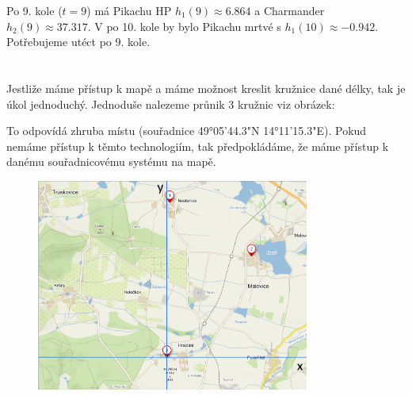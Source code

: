 \documentclass[12pt, a4paper]{article}
\begin{document}
Po 9. kole ($t=9$) má Pikachu HP $h_1(9) \approx 6.864$ a Charmander $h_2(9) \approx 37.317$. V po 10. kole by bylo Pikachu mrtvé s $h_1(10) \approx -0.942$. Potřebujeme utéct po 9. kole.

\section{}
Jestliže máme přístup k mapě a máme možnost kreslit kružnice dané délky, tak je úkol jednoduchý. Jednoduše nalezeme průnik 3 kružnic viz obrázek:
\begin{figure}[H]
  \centering
  \hfill
\end{figure}

To odpovídá zhruba místu  (souřadnice 49°05'44.3"N 14°11'15.3"E). Pokud nemáme přístup k těmto technologiím, tak předpokládáme, že máme přístup k danému souřadnicovému systému na mapě.
\begin{figure}[h]
  \centering
  \includegraphics[width=0.8\textwidth]{obr_3.png}
\end{figure}
\end{document}
